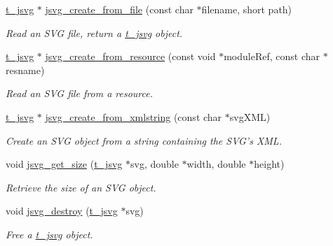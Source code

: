 \begin{DoxyCompactItemize}
\item 
\hyperlink{group__jgraphics_gaa3000c3aa85e3d7c87f59c44d5d7ccab}{t\_\-jsvg} $\ast$ \hyperlink{group__jsvg_ga3b185fbdeba32bc51a9935a91a97eba5}{jsvg\_\-create\_\-from\_\-file} (const char $\ast$filename, short path)
\begin{DoxyCompactList}\small\item\em Read an SVG file, return a \hyperlink{group__jgraphics_gaa3000c3aa85e3d7c87f59c44d5d7ccab}{t\_\-jsvg} object. \item\end{DoxyCompactList}\item 
\hyperlink{group__jgraphics_gaa3000c3aa85e3d7c87f59c44d5d7ccab}{t\_\-jsvg} $\ast$ \hyperlink{group__jsvg_ga1c2545a3afc0538ead5aa46903bad73d}{jsvg\_\-create\_\-from\_\-resource} (const void $\ast$moduleRef, const char $\ast$resname)
\begin{DoxyCompactList}\small\item\em Read an SVG file from a resource. \item\end{DoxyCompactList}\item 
\hyperlink{group__jgraphics_gaa3000c3aa85e3d7c87f59c44d5d7ccab}{t\_\-jsvg} $\ast$ \hyperlink{group__jsvg_gae8173348a7e250c0e762438a75dacee3}{jsvg\_\-create\_\-from\_\-xmlstring} (const char $\ast$svgXML)
\begin{DoxyCompactList}\small\item\em Create an SVG object from a string containing the SVG's XML. \item\end{DoxyCompactList}\item 
void \hyperlink{group__jsvg_ga84eaba3340526cf8984bb8354993304f}{jsvg\_\-get\_\-size} (\hyperlink{group__jgraphics_gaa3000c3aa85e3d7c87f59c44d5d7ccab}{t\_\-jsvg} $\ast$svg, double $\ast$width, double $\ast$height)
\begin{DoxyCompactList}\small\item\em Retrieve the size of an SVG object. \item\end{DoxyCompactList}\item 
void \hyperlink{group__jsvg_ga4b65c02fa6c10d1a9c6260ec1b30e453}{jsvg\_\-destroy} (\hyperlink{group__jgraphics_gaa3000c3aa85e3d7c87f59c44d5d7ccab}{t\_\-jsvg} $\ast$svg)
\begin{DoxyCompactList}\small\item\em Free a \hyperlink{group__jgraphics_gaa3000c3aa85e3d7c87f59c44d5d7ccab}{t\_\-jsvg} object. \item\end{DoxyCompactList}\item 

\end{DoxyCompactItemize}
